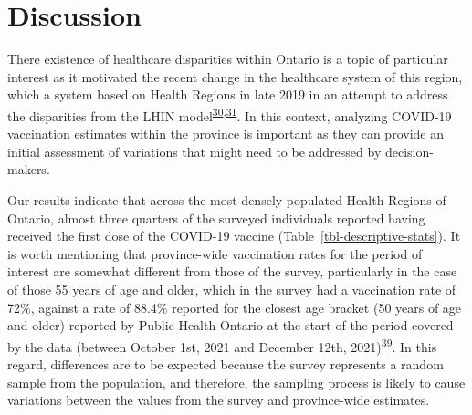 \documentclass[
  letterpaper,
  DIV=11,
  numbers=noendperiod]{scrartcl}
\begin{document}
\normalsize

\hypertarget{discussion}{%
\section{Discussion}\label{discussion}}

There existence of healthcare disparities within Ontario is a topic of
particular interest as it motivated the recent change in the healthcare
system of this region, which a system based on Health Regions in late
2019 in an attempt to address the disparities from the LHIN
model\textsuperscript{\protect\hyperlink{ref-tsasis2012}{30},\protect\hyperlink{ref-dong2022}{31}}.
In this context, analyzing COVID-19 vaccination estimates within the
province is important as they can provide an initial assessment of
variations that might need to be addressed by decision-makers.

Our results indicate that across the most densely populated Health
Regions of Ontario, almost three quarters of the surveyed individuals
reported having received the first dose of the COVID-19 vaccine
(Table~\ref{tbl-descriptive-stats}). It is worth mentioning that
province-wide vaccination rates for the period of interest are somewhat
different from those of the survey, particularly in the case of those 55
years of age and older, which in the survey had a vaccination rate of
72\%, against a rate of 88.4\% reported for the closest age bracket (50
years of age and older) reported by Public Health Ontario at the start
of the period covered by the data (between October 1st, 2021 and
December 12th,
2021)\textsuperscript{\protect\hyperlink{ref-ontario-covid}{39}}. In
this regard, differences are to be expected because the survey
represents a random sample from the population, and therefore, the
sampling process is likely to cause variations between the values from
the survey and province-wide estimates.
\end{document}
